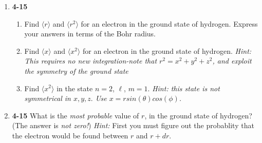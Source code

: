 \documentclass[fleqn]{article}
\begin{document}
  \begin{enumerate}
    \item \textbf{4-15}
    \begin{enumerate}
      \item Find $\langle r \rangle$ and $\langle r^2 \rangle$ for an electron in the ground state of hydrogen. Express your
      answers in terms of the Bohr radius. 


      \item Find $\langle x \rangle$ and $\langle x^2 \rangle$ for an electron in the ground state of hydrogen. 
      \emph{Hint: This requires no new integration-note that $r^2=x^2+y^2+z^2$, and exploit the symmetry of the ground state}



      \item Find $\langle x^2 \rangle$ in the state $n=2$, $\ell$, $m=1$. \emph{Hint: this state is not symmetrical in 
      $x, y,z.$ Use $x=r sin(\theta) cos(\phi)$.}


    \end{enumerate}

    \item \textbf{4-15} What is the \emph{most probable} value of $r$, in the ground state of hydrogen? 
    (The answer is \emph{not zero!}) \emph{Hint:} First you must figure out the probablity that the electron would be found between
    $r$ and $r+dr$.


  \end{enumerate}
\end{document}
